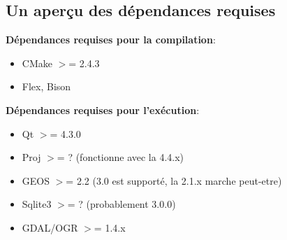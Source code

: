 
%
%
%
%

\subsection{Un aper\c{c}u des d\'ependances requises}

\textbf{D\'ependances requises pour la compilation}:

\begin{itemize}
\item CMake $>$= 2.4.3
\item Flex, Bison
\end{itemize}

\textbf{D\'ependances requises pour l'ex\'ecution}:

\begin{itemize}
\item Qt $>$= 4.3.0
\item Proj $>$= ? (fonctionne avec la 4.4.x)
\item GEOS $>$= 2.2 (3.0 est support\'e, la 2.1.x marche peut-etre)
\item Sqlite3 $>$= ? (probablement 3.0.0)
\item GDAL/OGR $>$= 1.4.x
\end{itemize}

